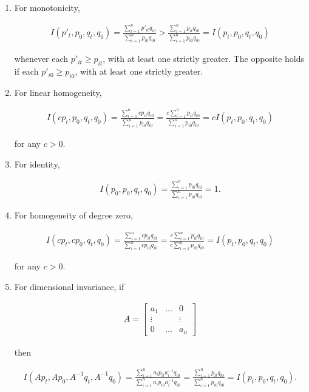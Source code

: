 \documentclass[]{article}
\begin{document}
\begin{enumerate}
\def\labelenumi{\arabic{enumi}.}
\item
  For monotonicity,

  \begin{align*}
  I(p'_{t}, p_{0}, q_{t}, q_{0}) =  \frac{\sum_{i=1}^{n} p'_{it}q_{i0}}{\sum_{i=1}^{n} p_{i0}q_{i0}} > \frac{\sum_{i=1}^{n} p_{it}q_{i0}}{\sum_{i=1}^{n} p_{i0}q_{i0}} = I(p_{t}, p_{0}, q_{t}, q_{0}) 
   \end{align*}

  whenever each \(p'_{it} \geq p_{it}\), with at least one strictly greater. The opposite holds if each \(p'_{i0} \geq p_{i0}\), with at least one strictly greater.
\item
  For linear homogeneity,

  \begin{align*}
  I(cp_{t}, p_{0}, q_{t}, q_{0}) =  \frac{\sum_{i=1}^{n} cp_{it}q_{i0}}{\sum_{i=1}^{n} p_{i0}q_{i0}} = \frac{c\sum_{i=1}^{n} p_{it}q_{i0}}{\sum_{i=1}^{n} p_{i0}q_{i0}} = cI(p_{t}, p_{0}, q_{t}, q_{0}) 
   \end{align*}

  for any \(c > 0\).
\item
  For identity,

  \begin{align*}
  I(p_{0}, p_{0}, q_{t}, q_{0}) =  \frac{\sum_{i=1}^{n} p_{i0}q_{i0}}{\sum_{i=1}^{n} p_{i0}q_{i0}} = 1.
   \end{align*}
\item
  For homogeneity of degree zero,

  \begin{align*}
  I(cp_{t}, cp_{0}, q_{t}, q_{0}) =  \frac{\sum_{i=1}^{n} cp_{it}q_{i0}}{\sum_{i=1}^{n} cp_{i0}q_{i0}} = \frac{c\sum_{i=1}^{n} p_{it}q_{i0}}{c\sum_{i=1}^{n} p_{i0}q_{i0}} = I(p_{t}, p_{0}, q_{t}, q_{0}) 
   \end{align*}

  for any \(c > 0\).
\item
  For dimensional invariance, if

  \begin{align*}
  A = 
  \begin{bmatrix}
  a_1 & \ldots & 0 \\
  \vdots & & \vdots \\
  0 & \ldots & a_n
  \end{bmatrix}
   \end{align*}

  then

  \begin{align*}
  I(Ap_{t}, Ap_{0}, A^{-1}q_{t}, A^{-1}q_{0}) = \frac{\sum_{i=1}^{n} a_{i}p_{it}a_{i}^{-1}q_{i0}}{\sum_{i=1}^{n} a_{i}p_{i0}a_{i}^{-1}q_{i0}} = \frac{\sum_{i=1}^{n} p_{it}q_{i0}}{\sum_{i=1}^{n} p_{i0}q_{i0}} = I(p_{t}, p_{0}, q_{t}, q_{0}). 
   \end{align*}
\end{enumerate}
\end{document}
